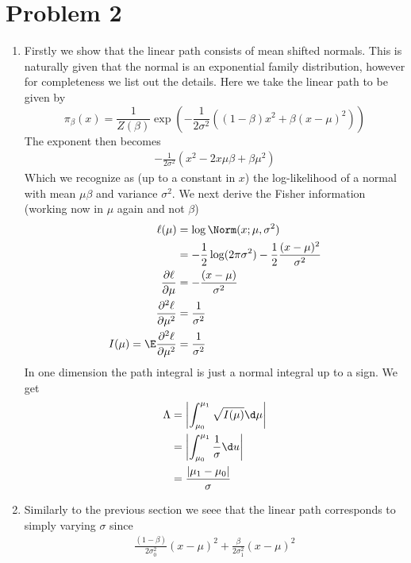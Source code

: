 \documentclass{article}
\begin{document}
\section{Problem 2}
\begin{enumerate}
    \item %
    Firstly we show that the linear path consists of mean shifted normals. This
    is naturally given that the normal is an exponential family distribution,
    however for completeness we list out the details. Here
    we take the linear path to be given by
    \[
        \pi_\beta(x) = \frac{1}{Z(\beta)}
        \exp\left(-\frac {1}{2\sigma^2}\left(
            (1-\beta) x^2 + \beta(x-\mu)^2
        \right)\right)
    \]
    The exponent then becomes 
    \begin{align}
        -\frac 1 {2\sigma^2}\left(
            x^2 - 2x\mu\beta + \beta\mu^2
        \right)
    \end{align}
    Which we recognize as (up to a constant in $x$) the log-likelihood of a
    normal with mean $\mu\beta$ and variance $\sigma^2$.
    We next derive the Fisher information (working now in $\mu$ again and
    not $\beta$) 
    \begin{align}
        \ell(\mu) &= \log \Norm(x; \mu, \sigma^2) \\
            &= -\frac 1 2 \log(2\pi\sigma^2) - \frac 1 2 \frac{(x-\mu)^2}{\sigma^2} \\
        \frac{\partial \ell}{\partial \mu} &=
            -\frac{(x-\mu)}{\sigma^2} \\
        \frac{\partial^2 \ell}{\partial \mu^2} &= \frac{1}{\sigma^2} \\
        I(\mu) = \E\frac{\partial^2 \ell}{\partial \mu^2} &= \frac{1}{\sigma^2}
    \end{align}
    In one dimension the path integral is just a normal integral up to a sign. 
    We get
    \begin{align}
        \Lambda &= \left| \int_{\mu_0}^{\mu_1} \sqrt{I(\mu)} \d \mu \right| \\
            &= \left| \int_{\mu_0}^{\mu_1} \frac{1}{\sigma} \d u \right| \\
            &= \frac{|\mu_1-\mu_0|}{\sigma}
    \end{align}
    \item %
    Similarly to the previous section we seee that the linear path corresponds
    to simply varying $\sigma$ since 
    \begin{align}
        \frac{(1-\beta)}{2\sigma_0^2} (x-\mu)^2 + \frac{\beta}{2\sigma_1^2} (x-\mu)^2 

\end{align}
\end{enumerate}
\end{document}
